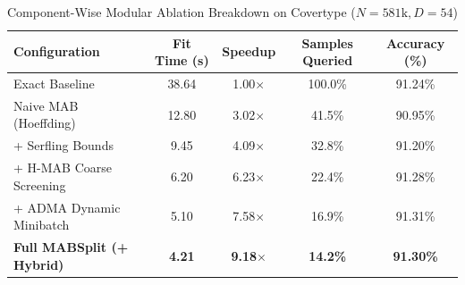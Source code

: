 \begin{table}[htbp]
\centering
\caption{Component-Wise Modular Ablation Breakdown on Covertype ($N=581\text{k}, D=54$)}
\label{tab:ablation}
\begin{tabular}{lcccc}
\toprule
\textbf{Configuration} & \textbf{Fit Time (s)} & \textbf{Speedup} & \textbf{Samples Queried} & \textbf{Accuracy (\%)} \\
\midrule
Exact Baseline & 38.64 & 1.00$\times$ & 100.0\% & 91.24\% \\
Naive MAB (Hoeffding) & 12.80 & 3.02$\times$ & 41.5\% & 90.95\% \\
+ Serfling Bounds & 9.45 & 4.09$\times$ & 32.8\% & 91.20\% \\
+ H-MAB Coarse Screening & 6.20 & 6.23$\times$ & 22.4\% & 91.28\% \\
+ ADMA Dynamic Minibatch & 5.10 & 7.58$\times$ & 16.9\% & 91.31\% \\
\textbf{Full MABSplit (+ Hybrid)} & \textbf{4.21} & \textbf{9.18$\times$} & \textbf{14.2\%} & \textbf{91.30\%} \\
\bottomrule
\end{tabular}
\end{table}
